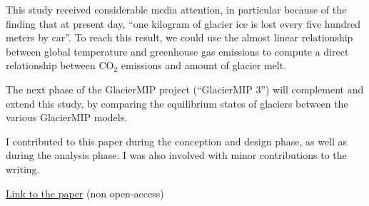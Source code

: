This study received considerable media attention, in particular because of the finding that at present day,
“one kilogram of glacier ice is lost every five hundred meters by car”. To reach this result, we could use
the almost linear relationship between global temperature and greenhouse gas emissions
to compute a direct relationship between CO\(_2\) emissions and amount of glacier melt.

The next phase of the GlacierMIP project (“GlacierMIP 3”) will complement and extend this study, by comparing
the equilibrium states of glaciers between the various GlacierMIP models.

I contributed to this paper during the conception and design phase, as well as during the
analysis phase. I was also involved with minor contributions to the writing.

\href{https://doi.org/10.1038/s41558-018-0093-1}{Link to the paper} (non open-access)

\iflong  \else \fi 

